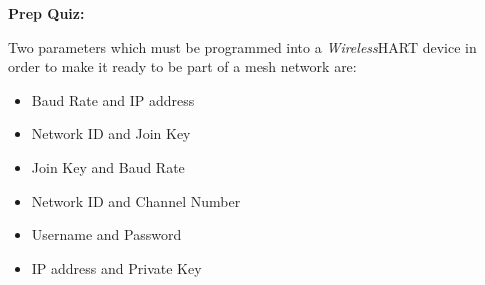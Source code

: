 \vfil \eject

\noindent
{\bf Prep Quiz:}

Two parameters which must be programmed into a {\sl Wireless}HART device in order to make it ready to be part of a mesh network are:

\begin{itemize}
\item{} Baud Rate and IP address
\vskip 5pt 
\item{} Network ID and Join Key
\vskip 5pt 
\item{} Join Key and Baud Rate
\vskip 5pt 
\item{} Network ID and Channel Number
\vskip 5pt 
\item{} Username and Password
\vskip 5pt 
\item{} IP address and Private Key
\end{itemize}






